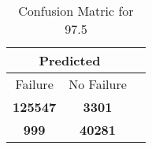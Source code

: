 \begin{table}[] 
\caption{Confusion Matric for 97.5} 
\label{Table: Prediction Accuracy-DMD97.5OnlySunEKF-resetReflection-Reflection} 
\centering 
\begin{tabular} 
 {@{}ccc@{}} 
\toprule 
\multicolumn{2}{c}{\textbf{Predicted}}
 \\ \midrule 
\multicolumn{1}{|c|}{Failure} & 
\multicolumn{1}{c|}{No Failure}
 \\ \midrule 
\multicolumn{1}{|c|}{\color{green}\textbf{125547}} & 
\multicolumn{1}{c|}{\color{red}\textbf{3301}}
 \\ \midrule 
\multicolumn{1}{|c|}{\color{red}\textbf{999}} & 
\multicolumn{1}{c|}{\color{green}\textbf{40281}}
 \\ \bottomrule 
\end{tabular} 
\end{table} 
